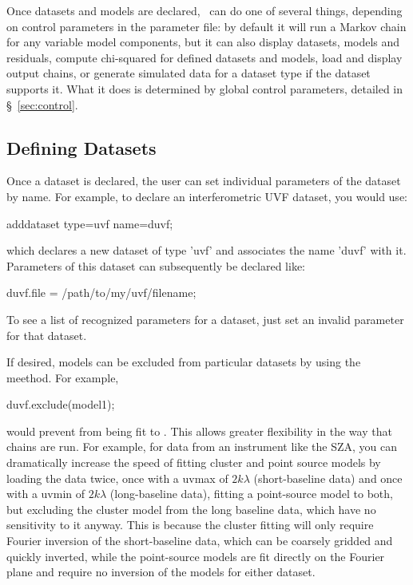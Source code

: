 Once datasets and models are declared, \climaxb\ can do one of several
things, depending on control parameters in the parameter file: by
default it will run a Markov chain for any variable model components,
but it can also display datasets, models and residuals, compute
chi-squared for defined datasets and models, load and display output
chains, or generate simulated data for a dataset type if the dataset
supports it.  What it does is determined by global control parameters,
detailed in \S~\ref{sec:control}.

\subsection{Defining Datasets}
\label{sec:datasets}

Once a dataset is declared, the user can set individual parameters of
the dataset by name.  For example, to declare an interferometric UVF
dataset, you would use:

\begin{myindentpar}{3cm}
adddataset type=uvf name=duvf;
\end{myindentpar}

which declares a new dataset of type 'uvf' and associates the name
'duvf' with it. Parameters of this dataset can subsequently be
declared like:

\begin{myindentpar}{3cm}
duvf.file = /path/to/my/uvf/filename;
\end{myindentpar}

To see a list of recognized parameters for a dataset, just set an
invalid parameter for that dataset.

If desired, models can be excluded from particular datasets by using
the  meethod.  For example,

\begin{myindentpar}{3cm}
duvf.exclude(model1);
\end{myindentpar}

would prevent  from being fit to .  This
allows greater flexibility in the way that chains are run.  For
example, for data from an instrument like the SZA, you can
dramatically increase the speed of fitting cluster and point source
models by loading the data twice, once with a uvmax of $2 k\lambda$
(short-baseline data) and once with a uvmin of $2 k\lambda$
(long-baseline data), fitting a point-source model to both, but
excluding the cluster model from the long baseline data, which have no
sensitivity to it anyway.  This is because the cluster fitting will
only require Fourier inversion of the short-baseline data, which can
be coarsely gridded and quickly inverted, while the point-source
models are fit directly on the Fourier plane and require no inversion
of the models for either dataset.

